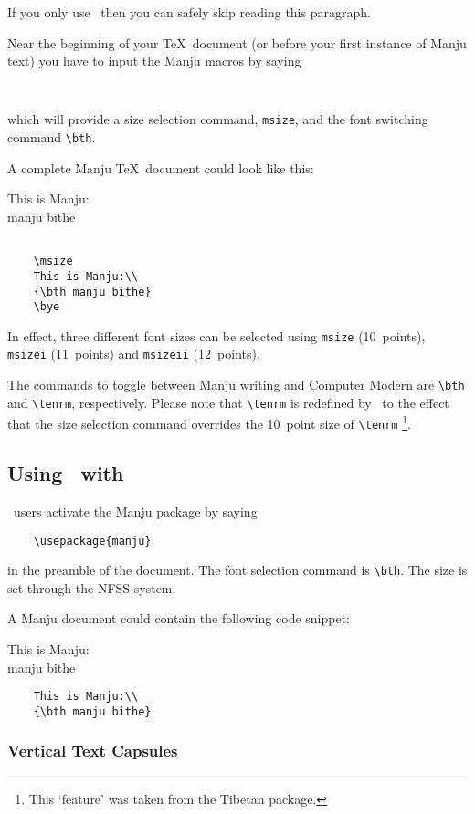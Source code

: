 \documentclass[a4paper,11pt]{article}
\newcommand\exa{\nopagebreak \begin{flushleft}\smallskip \nopagebreak
                \begin{minipage}[t]{6cm}\sloppy}
\newcommand\exb{\end{minipage}\kern 1cm\begin{minipage}[t]{8cm}\sloppy }
\newcommand\exc{\end{minipage}\kern -3cm \smallskip\end{flushleft}}
\begin{document}
If you only use \LaTeXe\ then you can safely skip reading this
paragraph.

Near the beginning of your \TeX\ document (or before your first
instance of Manju text) you have to input the Manju macros by saying
\begin{verbatim}
	
\end{verbatim} 
which will provide a size selection command, \verb*-msize-, and the
font switching command \verb*-\bth-.

A complete Manju \TeX\ document could look like this:

\exa
	This is Manju:\\
	{\bth manju bithe}
\exb
	\begin{verbatim}
	
	\msize
	This is Manju:\\
	{\bth manju bithe}
	\bye
	\end{verbatim}
\exc

In effect, three different font sizes can be selected using
\verb*-msize- (10~points),
\verb*-msizei- (11~points) and
\verb*-msizeii- (12~points).

The commands to toggle between Manju writing and Computer Modern
are \verb*-\bth- and \verb*-\tenrm-, respectively. Please note that
\verb*-\tenrm- is redefined by \ManjuTeX\ to the effect that the size
selection command overrides the 10~point size of \verb*-\tenrm-%
	\footnote{This `feature' was taken from the Tibetan
		package.}.

\subsection{Using \ManjuTeX\ with \LaTeXe}

\LaTeXe\ users activate the Manju package by saying
\begin{verbatim}
	\usepackage{manju}
\end{verbatim} 
in the preamble of the document. The font selection command is
\verb*-\bth-. The size is set through the NFSS system.

A Manju document could contain the following code snippet:

\exa
	This is Manju:\\
	{\bth manju bithe}
\exb
	\begin{verbatim}
	This is Manju:\\
	{\bth manju bithe}
	\end{verbatim}
\exc

\subsubsection{Vertical Text Capsules}
\end{document}
